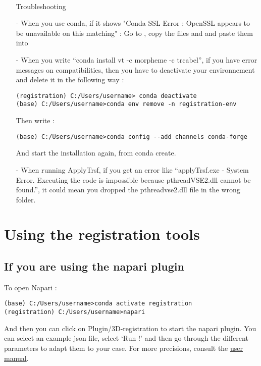 \documentclass[11pt]{article}
\begin{document}
\begin{itemize}
\paragraph{}Troubleshooting
\item[-]When you use conda, if it shows "Conda SSL Error : OpenSSL appears to be unavailable on this matching" : Go to ,
copy the files  and  and paste them into 
\item[-]When you write “conda install vt -c morpheme -c trcabel”, if you have error messages on compatibilities, then you have to deactivate your environnement and delete it in the following way :
\begin{verbatim}
(registration) C:/Users/username> conda deactivate
(base) C:/Users/username>conda env remove -n registration-env
\end{verbatim}
Then write :
\begin{verbatim}
(base) C:/Users/username>conda config --add channels conda-forge
 \end{verbatim}
And start the installation again, from conda create.
\item[-]When running ApplyTrsf, if you get an error like “applyTrsf.exe - System Error. Executing the code is impossible because pthreadVSE2.dll cannot be found.”, it could mean you dropped the pthreadvse2.dll file in the wrong folder.
\end{itemize}

\section{Using the registration tools}
\subsection{If you are using the napari plugin}
To open Napari :
\begin{verbatim}
(base) C:/Users/username>conda activate registration
(registration) C:/Users/username>napari
\end{verbatim}
And then you can click on Plugin/3D-registration to start the napari plugin. 
You can select an example json file, select ‘Run !’  and then go through the different parameters to adapt them to your case.
For more precisions, consult the \href{https://github.com/GuignardLab/napari-3D-registration}{user manual}.
\end{document}
